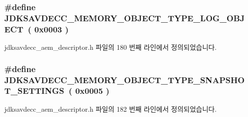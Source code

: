 \subsubsection[{\texorpdfstring{J\+D\+K\+S\+A\+V\+D\+E\+C\+C\+\_\+\+M\+E\+M\+O\+R\+Y\+\_\+\+O\+B\+J\+E\+C\+T\+\_\+\+T\+Y\+P\+E\+\_\+\+L\+O\+G\+\_\+\+O\+B\+J\+E\+CT}{JDKSAVDECC_MEMORY_OBJECT_TYPE_LOG_OBJECT}}]{\setlength{\rightskip}{0pt plus 5cm}\#define J\+D\+K\+S\+A\+V\+D\+E\+C\+C\+\_\+\+M\+E\+M\+O\+R\+Y\+\_\+\+O\+B\+J\+E\+C\+T\+\_\+\+T\+Y\+P\+E\+\_\+\+L\+O\+G\+\_\+\+O\+B\+J\+E\+CT~( 0x0003 )}\hypertarget{group__memory__object__type_ga2457e1f66a991f2be1184ac0ed77c034}{}\label{group__memory__object__type_ga2457e1f66a991f2be1184ac0ed77c034}


jdksavdecc\+\_\+aem\+\_\+descriptor.\+h 파일의 180 번째 라인에서 정의되었습니다.

\subsubsection[{\texorpdfstring{J\+D\+K\+S\+A\+V\+D\+E\+C\+C\+\_\+\+M\+E\+M\+O\+R\+Y\+\_\+\+O\+B\+J\+E\+C\+T\+\_\+\+T\+Y\+P\+E\+\_\+\+S\+N\+A\+P\+S\+H\+O\+T\+\_\+\+S\+E\+T\+T\+I\+N\+GS}{JDKSAVDECC_MEMORY_OBJECT_TYPE_SNAPSHOT_SETTINGS}}]{\setlength{\rightskip}{0pt plus 5cm}\#define J\+D\+K\+S\+A\+V\+D\+E\+C\+C\+\_\+\+M\+E\+M\+O\+R\+Y\+\_\+\+O\+B\+J\+E\+C\+T\+\_\+\+T\+Y\+P\+E\+\_\+\+S\+N\+A\+P\+S\+H\+O\+T\+\_\+\+S\+E\+T\+T\+I\+N\+GS~( 0x0005 )}\hypertarget{group__memory__object__type_ga8a82d943c1853ce85ec253359e33832f}{}\label{group__memory__object__type_ga8a82d943c1853ce85ec253359e33832f}


jdksavdecc\+\_\+aem\+\_\+descriptor.\+h 파일의 182 번째 라인에서 정의되었습니다.


